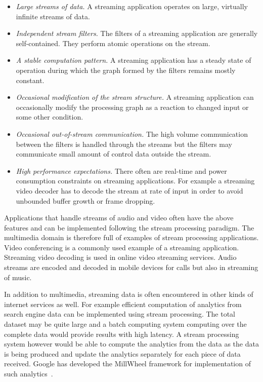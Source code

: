 \begin{itemize}
    \item \textit{Large streams of data.} A streaming application operates on large, virtually infinite streams of data.
    \item \textit{Independent stream filters.} The filters of a streaming application are generally self-contained. They perform atomic operations on the stream.
    \item \textit{A stable computation pattern.} A streaming application has a steady state of operation during which the graph formed by the filters remains mostly constant.
    \item \textit{Occasional modification of the stream structure.} A streaming application can occasionally modify the processing graph as a reaction to changed input or some other condition.
    \item \textit{Occasional out-of-stream communication.} The high volume communication between the filters is handled through the streams but the filters may communicate small amount of control data outside the stream.
    \item \textit{High performance expectations.} There often are real-time and power consumption constraints on streaming applications. For example a streaming video decoder has to decode the stream at rate of input in order to avoid unbounded buffer growth or frame dropping.
\end{itemize}

Applications that handle streams of audio and video often have the above features and can be implemented following the stream processing paradigm. The multimedia domain is therefore full of examples of stream processing applications. Video conferencing is a commonly used example of a streaming application. Streaming video decoding is used in online video streaming services. Audio streams are encoded and decoded in mobile devices for calls but also in streaming of music.

In addition to multimedia, streaming data is often encountered in other kinds of internet services as well. For example efficient computation of analytics from search engine data can be implemented using stream processing. The total dataset may be quite large and a batch computing system computing over the complete data would provide results with high latency. A stream processing system however would be able to compute the analytics from the data as the data is being produced and update the analytics separately for each piece of data received. Google has developed the MillWheel framework for implementation of such analytics~\cite{tyler2013millwheel}.

